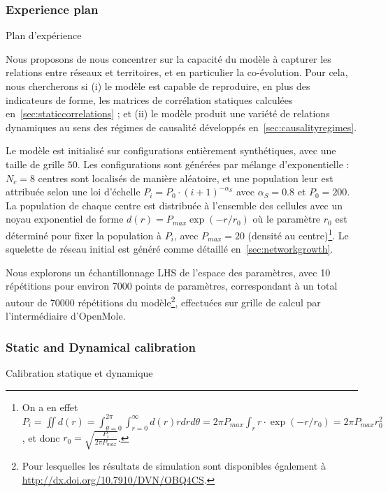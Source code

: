 \subsubsection{Experience plan}{Plan d'expérience}

Nous proposons de nous concentrer sur la capacité du modèle à capturer les relations entre réseaux et territoires, et en particulier la co-évolution. Pour cela, nous chercherons si (i) le modèle est capable de reproduire, en plus des indicateurs de forme, les matrices de corrélation statiques calculées en~\ref{sec:staticcorrelations} ; et (ii) le modèle produit une variété de relations dynamiques au sens des régimes de causalité développés en~\ref{sec:causalityregimes}.

Le modèle est initialisé sur configurations entièrement synthétiques, avec une taille de grille $50$. Les configurations sont générées par mélange d'exponentielle : $N_c = 8$ centres sont localisés de manière aléatoire, et une population leur est attribuée selon une loi d'échelle $P_i = P_0\cdot (i+1)^{-\alpha_S}$ avec $\alpha_S = 0.8$ et $P_0 = 200$. La population de chaque centre est distribuée à l'ensemble des cellules avec un noyau exponentiel de forme $d(r) = P_{max}\exp\left( - r / r_0\right)$ où le paramètre $r_0$ est déterminé pour fixer la population à $P_i$, avec $P_{max} = 20$ (densité au centre)\footnote{On a en effet $P_i = \iint d(r) = \int_{\theta=0}^{2\pi} \int_{r=0}^{\infty} d(r) rdrd\theta = 2 \pi P_{max} \int_r r\cdot \exp\left( - r / r_0\right) = 2 \pi P_{max} r_0^2$, et donc $r_0 = \sqrt{\frac{P_i}{2\pi P_{max}}}$.}. Le squelette de réseau initial est généré comme détaillé en~\ref{sec:networkgrowth}.

Nous explorons un échantillonnage LHS de l'espace des paramètres, avec 10 répétitions pour environ 7000 points de paramètres, correspondant à un total autour de 70000 répétitions du modèle\footnote{Pour lesquelles les résultats de simulation sont disponibles également à \url{http://dx.doi.org/10.7910/DVN/OBQ4CS}.}, effectuées sur grille de calcul par l'intermédiaire d'OpenMole.



\subsubsection{Static and Dynamical calibration}{Calibration statique et dynamique}




